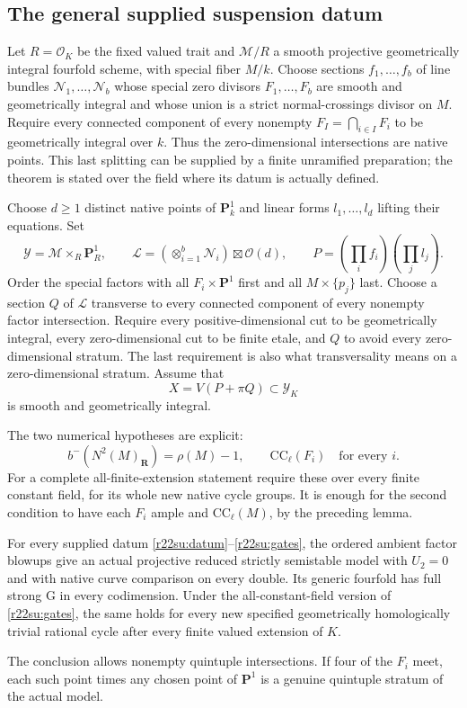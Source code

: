 \subsection{The general supplied suspension datum}

Let $R=\mathcal O_K$ be the fixed valued trait and
$\mathcal M/R$ a smooth projective geometrically integral
fourfold scheme, with special fiber $M/k$.  Choose sections
$f_1,\ldots,f_b$ of line bundles $\mathcal N_1,\ldots,\mathcal N_b$
whose special zero divisors $F_1,\ldots,F_b$ are smooth and
geometrically integral and whose union is a strict normal-crossings
divisor on $M$.  Require every connected component of every
nonempty $F_I=\bigcap_{i\in I}F_i$ to be geometrically integral
over $k$.  Thus the zero-dimensional intersections are native
points.  This last splitting can be supplied by a finite
unramified preparation; the theorem is stated over the field
where its datum is actually defined.

Choose $d\ge1$ distinct native points of $\mathbf P^1_k$ and
linear forms $l_1,\ldots,l_d$ lifting their equations.  Set
\[
 \mathcal Y=\mathcal M\times_R\mathbf P^1_R,\qquad
 \mathcal L=(\mathop{\otimes}_{i=1}^b\mathcal N_i)
                              \boxtimes\mathcal O(d),\qquad
 P=(\prod_i f_i)(\prod_j l_j).
 \tag{SU22.3}\label{r22su:datum}
\]
Order the special factors with all $F_i\times\mathbf P^1$
first and all $M\times\{p_j\}$ last.  Choose a section $Q$ of
$\mathcal L$ transverse to every connected component of every
nonempty factor intersection.  Require every positive-dimensional
cut to be geometrically integral, every zero-dimensional cut to
be finite etale, and $Q$ to avoid every zero-dimensional stratum.
The last requirement is also what transversality means on a
zero-dimensional stratum.  Assume that
\[
                  X=V(P+\pi Q)\subset\mathcal Y_K
 \tag{SU22.4}\label{r22su:X}
\]
is smooth and geometrically integral.

The two numerical hypotheses are explicit:
\[
 b^-(N^2(M)_{\mathbf R})=\rho(M)-1,\qquad
                    \mathrm{CC}_\ell(F_i)\quad\text{for every }i.
 \tag{SU22.5}\label{r22su:gates}
\]
For a complete all-finite-extension statement require these over
every finite constant field, for its whole new native cycle groups.
It is enough for the second condition to have each $F_i$ ample
and $\mathrm{CC}_\ell(M)$, by the preceding lemma.

\begin{theorem}
\label{r22su:theorem}
For every supplied datum \eqref{r22su:datum}--\eqref{r22su:gates},
the ordered ambient factor blowups give an actual projective
reduced strictly semistable model with $U_2=0$ and with native
curve comparison on every double.  Its generic fourfold has
full strong G in every codimension.  Under the all-constant-field
version of \eqref{r22su:gates}, the same holds for every new
specified geometrically homologically trivial rational cycle
after every finite valued extension of $K$.

The conclusion allows nonempty quintuple intersections.  If
four of the $F_i$ meet, each such point times any chosen point
of $\mathbf P^1$ is a genuine quintuple stratum of the actual
model.
\end{theorem}

